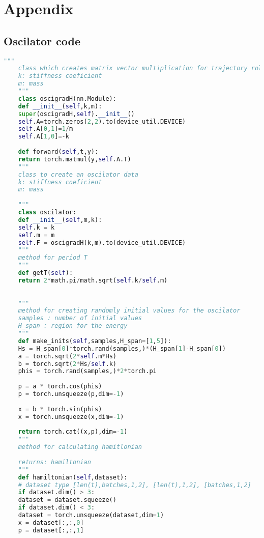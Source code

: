 \chapter{Appendix}
\begin{appendices}
	
	\renewcommand{\thesection}{A\arabic{section}}  %
	
	\section{Oscilator code}
\begin{lstlisting}[language=Python, caption={ocilator.py}]
	"""
	class which creates matrix vector multiplication for trajectory rollout
	k: stiffness coeficient
	m: mass
	"""
	class oscigradH(nn.Module):
	def __init__(self,k,m):
	super(oscigradH,self).__init__()
	self.A=torch.zeros(2,2).to(device_util.DEVICE)
	self.A[0,1]=1/m
	self.A[1,0]=-k
	
	def forward(self,t,y):
	return torch.matmul(y,self.A.T)
	"""
	class to create an oscilator data
	k: stiffness coeficient
	m: mass
	
	"""    
	class oscilator:
	def __init__(self,m,k):
	self.k = k
	self.m = m
	self.F = oscigradH(k,m).to(device_util.DEVICE)
	"""
	method for period T
	"""
	def getT(self):
	return 2*math.pi/math.sqrt(self.k/self.m)
	
	
	"""
	method for creating randomly initial values for the oscilator
	samples : number of initial values
	H_span : region for the energy
	"""	
	def make_inits(self,samples,H_span=[1,5]):
	Hs = H_span[0]*torch.rand(samples,)*(H_span[1]-H_span[0])
	a = torch.sqrt(2*self.m*Hs)
	b = torch.sqrt(2*Hs/self.k)
	phis = torch.rand(samples,)*2*torch.pi
	
	p = a * torch.cos(phis)
	p = torch.unsqueeze(p,dim=-1)
	
	x = b * torch.sin(phis)
	x = torch.unsqueeze(x,dim=-1)
	
	return torch.cat((x,p),dim=-1)
	"""
	method for calculating hamitlonian
	
	returns: hamiltonian
	"""
	def hamiltonian(self,dataset):
	# dataset type [len(t),batches,1,2], [len(t),1,2], [batches,1,2]
	if dataset.dim() > 3:
	dataset = dataset.squeeze()
	if dataset.dim() < 3:
	dataset = torch.unsqueeze(dataset,dim=1)
	x = dataset[:,:,0]
	p = dataset[:,:,1]
	

\end{lstlisting}
\end{appendices}
